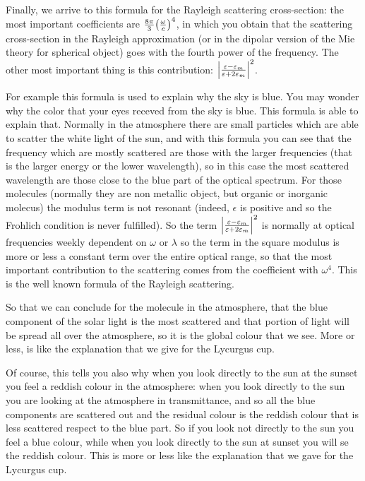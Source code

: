 \documentclass[../main/main.tex]{subfiles}
\begin{document}
Finally, we arrive to this formula for the Rayleigh scattering cross-section: the most important coefficients are \( \frac{8 \pi }{3} \qty(\frac{\omega }{c})^4  \), in which you obtain that the scattering cross-section in the Rayleigh approximation (or in the dipolar version of the Mie theory for spherical object) goes with the fourth power of the frequency. The other most important thing is this contribution: \( \abs{\frac{\varepsilon -\varepsilon _m}{\varepsilon + 2 \varepsilon _m}}^2  \).

For example this formula is used to explain why the sky is blue. You may wonder why the color that your eyes receved from the sky is blue. This formula is able to explain that. Normally in the atmosphere there are small particles which are able to scatter the white light of the sun, and with this formula you can see that the frequency which are mostly scattered are those with the larger frequencies (that is the larger energy or the lower wavelength), so in this case the most scattered wavelength are those close to the blue part of the optical spectrum.
For those molecules (normally they are non metallic object, but organic or inorganic molecus) the modulus term is not resonant (indeed, $\epsilon$ is positive and so the Frohlich condition is never fulfilled).
So the term \( \abs{\frac{\varepsilon -\varepsilon _m}{\varepsilon + 2 \varepsilon _m}}^2  \) is normally at optical frequencies weekly dependent on $\omega$ or $\lambda$ so the term in the square modulus is more or less a constant term over the entire optical range, so that the most important contribution to the scattering comes from the coefficient with $\omega^4$.
This is the well known formula of the Rayleigh scattering.

So that we can conclude for the molecule in the atmosphere, that the blue component of the solar light is the most scattered and that portion of light will be spread all over the atmosphere, so it is the global colour that we see.  More or less, is like the explanation that we give for the Lycurgus cup.

Of course, this tells you also why when you look directly to the sun at the sunset you feel a reddish colour in the atmosphere: when you look directly to the sun you are looking at the atmosphere in transmittance, and so all the blue components are scattered out and the residual colour is the reddish colour that is less scattered respect to the blue part.
So if you look not directly to the sun you feel a blue colour, while when you look directly to the sun at sunset you will se the reddish colour.
This is more or less like the explanation that we gave for the Lycurgus cup.
\end{document}
